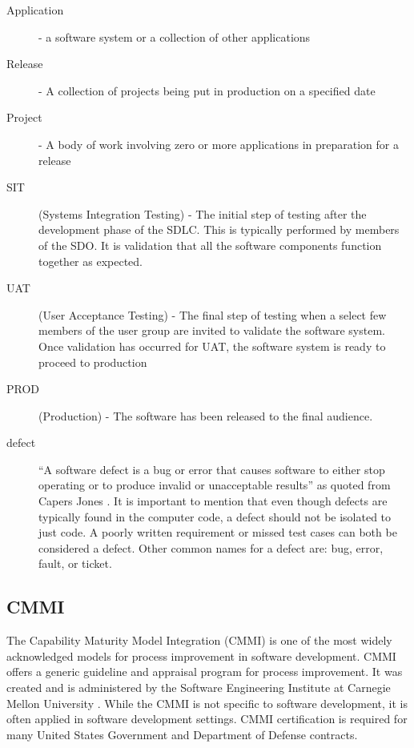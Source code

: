 \documentclass[SDSUThesis.tex]{subfiles}
\begin{document}
    \begin{description}
    
        \item[Application] - a software system or a collection of other applications 
        \item[Release] - A collection of projects being put in production on a specified date
        \item[Project] - A body of work involving zero or more applications in preparation for a release 
        \item[SIT] (Systems Integration Testing) - The initial step of testing
            after the development phase of the SDLC.  This is typically 
            performed by members of the SDO.  It is validation that all the
            software components function together as expected.
        \item[UAT] (User Acceptance Testing) - The final step of testing
            when a select few members of the user group are invited to
            validate the software system. Once validation has occurred for
            UAT, the software system is ready to proceed to production
        \item[PROD] (Production) - The software has been released to the 
        final audience.  
        \item[defect] ``A software defect is a bug or error that causes
                    software to either stop operating or to produce
                    invalid or unacceptable results'' as quoted from Capers Jones
                \cite{Jones2009}.  It is important to mention that even though defects are typically 
                found in the computer code, a defect should not be isolated to just code.   
                A poorly written requirement or missed test cases can 
                both be considered a defect.  Other common names for a defect 
                are: bug, error, fault, or ticket.
    \end{description}


\subsection{CMMI}
    The Capability Maturity Model Integration (CMMI)
     is one of the most 
    widely acknowledged models for process 
    improvement in software development.  CMMI offers a generic guideline 
    and appraisal program for process 
    improvement.  It was created and is administered by the 
    Software Engineering Institute at
    Carnegie Mellon University \cite{CMMI}. While the CMMI is not specific to software development,
    it is often applied in software development settings.
    CMMI certification is required for many United States Government 
    and Department of Defense contracts. 
    
\end{document}
